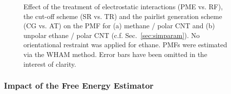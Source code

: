 \documentclass[9pt,lessons,pubversion]{livecoms}
\begin{document}
\begin{figure}[htb!]
  \centering    
  \caption{Effect of the treatment of electrostatic interactions (PME vs. RF), the cut-off scheme (SR vs. TR) and the pairlist generation scheme (CG vs. AT) on the PMF for (a) methane / polar CNT 
  and (b) unpolar ethane / polar CNT (c.f. Sec.~\ref{sec:simparam}). 
  No orientational restraint was applied for ethane. 
  PMFs were estimated via the WHAM method.
  Error bars have been omitted in the interest of clarity. 
}  
\label{fig:UP_LigCNT_electrst}
\end{figure}


\subsubsection*{Impact of the Free Energy Estimator}
\end{document}
